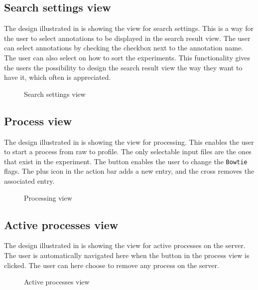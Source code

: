 \subsection{Search settings view}
The design illustrated in  is showing the view for search settings. 
This is a way for the user to select annotations to be displayed in the search result view.
The user can select annotations by checking the checkbox next to the annotation name.
The user can also select on how to sort the experiments.
This functionality gives the users the possibility to design the search result view the way they want to have it, which often is appreciated. 

\begin{figure}[ht]
\caption{Search settings view}
\label{fig:and_search_settings}
\end{figure}
\FloatBarrier

\subsection{Process view}
The design illustrated in  is showing the view for processing. 
This enables the user to start a process from raw to profile. The only selectable input files are the ones that exist in the experiment.
The  button enables the user to change the \verb!Bowtie! flags.
The plus icon in the action bar adds a new entry, and the cross removes the associated entry.

\begin{figure}[ht]
\caption{Processing view}
\label{fig:and_processing_view}
\end{figure}
\FloatBarrier

\subsection{Active processes view}
The design illustrated in  is showing the view for active processes on the server. 
The user is automatically navigated here when the  button in the process view is clicked.
The user can here choose to remove any process on the server.

\begin{figure}[ht]
\caption{Active processes view}
\label{fig:and_active_processes_view}
\end{figure}
\FloatBarrier
